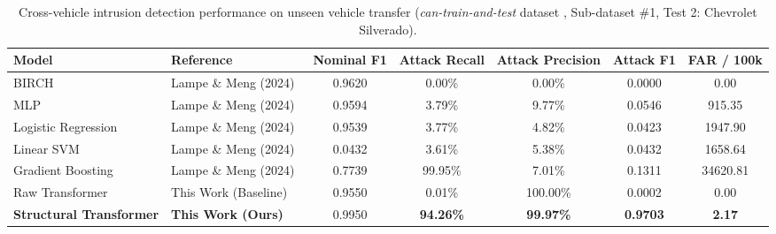 \begin{table}[t]
\centering
\caption{Cross-vehicle intrusion detection performance on unseen vehicle transfer (\textit{can-train-and-test} dataset \cite{LAMPE2024103777}, Sub-dataset \#1, Test 2: Chevrolet Silverado).}
\label{tab:comparison_lampe2024}
\begin{tabular}{llccccc}
\hline\hline
\textbf{Model} & \textbf{Reference} & \textbf{Nominal F1} & \textbf{Attack Recall} & \textbf{Attack Precision} & \textbf{Attack F1} & \textbf{FAR / 100k} \\
\hline
BIRCH & Lampe \& Meng (2024)~\cite{LAMPE2024103777} & 0.9620 & 0.00\% & 0.00\% & 0.0000 & 0.00 \\
MLP & Lampe \& Meng (2024)~\cite{LAMPE2024103777} & 0.9594 & 3.79\% & 9.77\% & 0.0546 & 915.35 \\
Logistic Regression & Lampe \& Meng (2024)~\cite{LAMPE2024103777} & 0.9539 & 3.77\% & 4.82\% & 0.0423 & 1947.90 \\
Linear SVM & Lampe \& Meng (2024)~\cite{LAMPE2024103777} & 0.0432 & 3.61\% & 5.38\% & 0.0432 & 1658.64 \\
Gradient Boosting & Lampe \& Meng (2024)~\cite{LAMPE2024103777} & 0.7739 & 99.95\% & 7.01\% & 0.1311 & 34620.81 \\
Raw Transformer & This Work (Baseline) & 0.9550 & 0.01\% & 100.00\% & 0.0002 & 0.00 \\
\textbf{Structural Transformer} & \textbf{This Work (Ours)} & 0.9950 & \textbf{94.26\%} & \textbf{99.97\%} & \textbf{0.9703} & \textbf{2.17} \\
\hline\hline
\end{tabular}
\end{table}